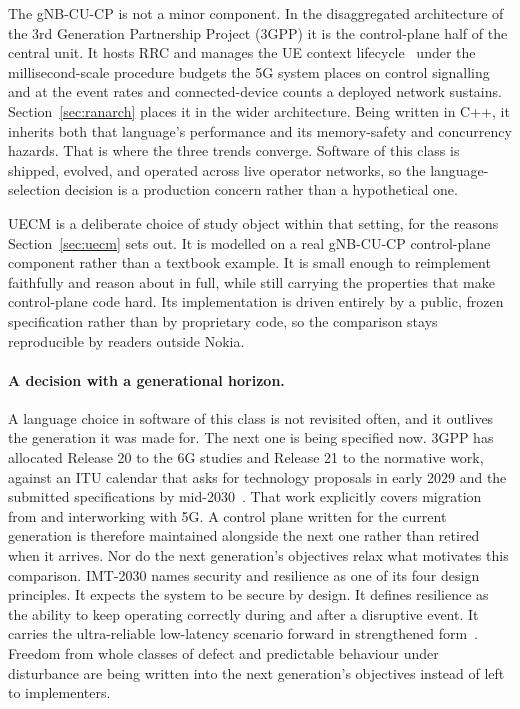 \documentclass[english,oneside,a4paper,censored,csm,software-track-2020]{HYthesisML}
\begin{document}
The gNB-CU-CP is not a minor component. In the disaggregated architecture of the 3rd Generation
Partnership Project (3GPP) it is the control-plane half of the central unit. It hosts RRC and
manages the UE context lifecycle~\cite{3gpp38401,3gpp38331} under the millisecond-scale
procedure budgets the 5G system places on control signalling~\cite{3gpp38913} and at the event
rates and connected-device counts a deployed network sustains. Section~\ref{sec:ranarch}
places it in the wider architecture. Being written in C++, it inherits both that language's
performance and its memory-safety and concurrency hazards. That is where the three trends
converge. Software of this class is shipped, evolved, and operated across live operator
networks, so the language-selection decision is a production concern rather than a hypothetical
one.

UECM is a deliberate choice of study object within that setting, for the reasons
Section~\ref{sec:uecm} sets out. It is modelled on a real gNB-CU-CP control-plane component
rather than a textbook example. It is small enough to reimplement faithfully and reason about
in full, while still carrying the properties that make control-plane code hard. Its
implementation is driven entirely by a public, frozen specification rather than by
proprietary code, so the comparison stays reproducible by readers outside Nokia.

\paragraph{A decision with a generational horizon.}
A language choice in software of this class is not revisited often, and it outlives the
generation it was made for. The next one is being specified now. 3GPP has allocated Release 20
to the 6G studies and Release 21 to the normative work, against an ITU calendar that asks for
technology proposals in early 2029 and the submitted specifications by
mid-2030~\cite{3gpp2024road6g}. That work explicitly covers migration from and interworking with
5G. A control plane written for the current generation is therefore maintained alongside the
next one rather than retired when it arrives. Nor do the next generation's objectives relax
what motivates this comparison. IMT-2030 names security and resilience as one of its four
design principles. It expects the system to be secure by design. It defines resilience as the
ability to keep operating correctly during and after a disruptive event. It carries the
ultra-reliable low-latency scenario forward in strengthened form~\cite{itu2023imt2030}.
Freedom from whole classes of defect and predictable behaviour under disturbance are being
written into the next generation's objectives instead of left to implementers.
\end{document}
